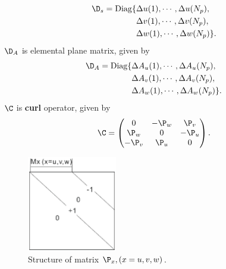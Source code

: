 \begin{align*}
\D_{s}=
\Diag\{&\Delta u(1),\cdots,\Delta u(N_{p}),\nonumber\\
			&\Delta v(1),\cdots,\Delta v(N_{p}),\nonumber\\
			&\Delta w(1),\cdots,\Delta w(N_{p})
\} \text{.}
\end{align*}
$\D_{A}$ is elemental plane matrix, given by
\begin{align*}
\D_{A}=
\Diag\{&\Delta A_{u}(1),\cdots,\Delta A_{u}(N_{p}),\nonumber\\
			&\Delta A_{v}(1),\cdots,\Delta A_{v}(N_{p}),\nonumber\\
			&\Delta A_{w}(1),\cdots,\Delta A_{w}(N_{p})
\} \text{.}
\end{align*}
$\C$ is \textbf{curl} operator, given by
\begin{equation*}
\C=
	\begin{pmatrix}
	0&-\P_{w}&\P_{v}\\
	\P_{w}&0&-\P_{u}\\
	-\P_{v}&\P_{u}&0
	\end{pmatrix} \text{.}
\end{equation*}
\begin{figure}[!ht]
\centering
\includegraphics[width=0.35\textwidth]{bilder/P_matrix}
\caption{Structure of matrix $\P_{x},(x=u,v,w)$.}
\label{fig:Matrix Px}
\end{figure}
